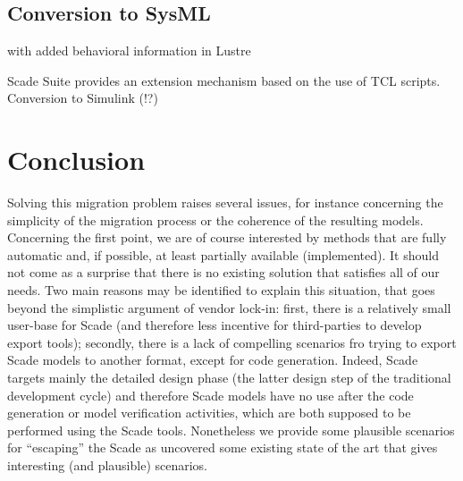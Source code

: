 \documentclass{template/openetcs_report}
\begin{document}
\section{Conversion to SysML}

with added behavioral information in Lustre

Scade Suite provides an extension mechanism based on the use of TCL scripts.
Conversion to Simulink (!?)



\chapter{Conclusion}


Solving this migration problem raises several issues, for instance
concerning the simplicity of the migration process or the coherence of
the resulting models. Concerning the first point, we are of course
interested by methods that are fully automatic and, if possible, at
least partially available (implemented). It should not come as a
surprise that there is no existing solution that satisfies all of our
needs. Two main reasons may be identified to explain this situation,
that goes beyond the simplistic argument of vendor lock-in: first,
there is a relatively small user-base for Scade (and therefore less
incentive for third-parties to develop export tools); secondly, there
is a lack of compelling scenarios fro trying to export Scade models to
another format, except for code generation. Indeed, Scade targets
mainly the detailed design phase (the latter design step of the
traditional development cycle) and therefore Scade models have no use
after the code generation or model verification activities, which are
both supposed to be performed using the Scade tools.  Nonetheless we
provide some plausible scenarios for ``escaping'' the Scade as
uncovered some existing state of the art that gives interesting (and
plausible) scenarios.







\end{document}

